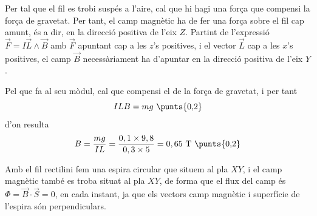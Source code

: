 \begin{solapartat}
Per tal que el fil es trobi suspés a l'aire, cal que hi hagi una força que compensi la força de gravetat. Per tant, el camp magnètic ha de fer una força sobre el fil cap amunt, és a dir, en la direcció positiva de l'eix $Z$.  Partint de l'expressió $\vec{F} = I\vec{L}\wedge\vec{B}$  amb $\vec{F}$  apuntant cap a les $z$'s positives, i el vector $\vec{L}$ cap a les $x$'s positives, el camp $\vec{B}$ necessàriament ha d'apuntar en la direcció positiva de l'eix $Y$.

Pel que fa al seu mòdul, cal que compensi el de la força de gravetat, i per tant
\[ ILB = mg\ \text{\punts{0,2}} \]
d'on resulta
\[ B = \frac{mg}{IL} = \frac{0,1\times 9,8}{0,3\times 5} = 0,65\ \mathrm{T}\ \text{\punts{0,2}} \]
\end{solapartat}

\begin{solapartat}
Amb el fil rectilini fem una espira circular que situem al pla $XY$, i el camp magnètic també es troba situat al pla $XY$, de forma que el flux del camp és $\Phi = \vec{B}\cdot\vec{S} = 0$, en cada instant, ja que els vectors camp magnètic i superfície de l'espira són perpendiculars. 
\end{solapartat}
